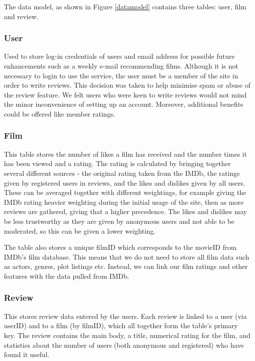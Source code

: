 \documentclass{sig-alt-release2}
\begin{document}
The data model, as shown in Figure \ref{datamodel} contains three tables: user, film and review. 
 
\subsubsection*{User}
Used to store log-in credentials of users and email address for possible future enhancements such as a weekly e-mail recommending films. Although it is not necessary to login to use the service, the user must be a member of the site in order to write reviews. This decision was taken to help minimise spam or abuse of the review feature. We felt users who were keen to write reviews would not mind the minor inconvenience of setting up an account. Moreover, additional benefits could be offered like member ratings. 

\subsubsection*{Film}
This table stores the number of likes a film has received and the number times it has been viewed and a rating. The rating is calculated by bringing together several different sources - the original rating taken from the IMDb, the ratings given by registered users in reviews, and the likes and dislikes given by all users. These can be averaged together with different weightings, for example giving the IMDb rating heavier weighting during the initial usage of the site, then as more reviews are gathered, giving that a higher precedence. The likes and dislikes may be less trustworthy as they are given by anonymous users and not able to be moderated, so this can be given a lower weighting.

The table also stores a unique filmID which corresponds to the movieID from IMDb's film database. This means that we do not need to store all film data such as actors, genres, plot listings etc. Instead, we can link our film ratings and other features with the data pulled from IMDb. 
 
\subsubsection*{Review}
This stores review data entered by the users. Each review is linked to a user (via userID) and to a film (by filmID), which all together form the table's primary key. The review contains the main body, a title, numerical rating for the film, and statistics about the number of users (both anonymous and registered) who have found it useful.
\end{document}
